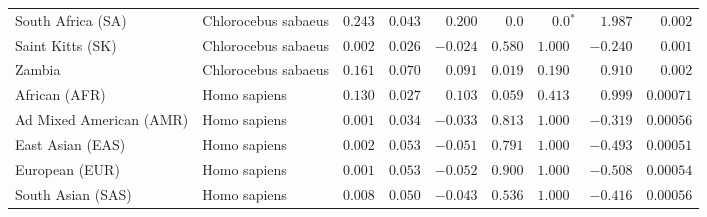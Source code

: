 \begin{center}
\begin{adjustbox}{width = 1\textwidth}
\begin{tabular}{|l|l|r|r|r|r|r|r|r|}
              South Africa (SA) &  Chlorocebus sabaeus &                                        $ 0.243$ &                                           $ 0.043$ &                      $ 0.200$ &            $0.0$ &                  $\bm{0.0{^*}}$ &                                           $ 1.987$ &           $ 0.002$ \\
               Saint Kitts (SK) &  Chlorocebus sabaeus &                                        $ 0.002$ &                                           $ 0.026$ &                      $-0.024$ &         $ 0.580$ &                      $ 1.000~~$ &                                           $-0.240$ &           $ 0.001$ \\
                         Zambia &  Chlorocebus sabaeus &                                        $ 0.161$ &                                           $ 0.070$ &                      $ 0.091$ &         $ 0.019$ &                      $ 0.190~~$ &                                           $ 0.910$ &           $ 0.002$ \\
                  African (AFR) &         Homo sapiens &                                        $ 0.130$ &                                           $ 0.027$ &                      $ 0.103$ &         $ 0.059$ &                      $ 0.413~~$ &                                           $ 0.999$ &          $0.00071$ \\
        Ad Mixed American (AMR) &         Homo sapiens &                                        $ 0.001$ &                                           $ 0.034$ &                      $-0.033$ &         $ 0.813$ &                      $ 1.000~~$ &                                           $-0.319$ &          $0.00056$ \\
               East Asian (EAS) &         Homo sapiens &                                        $ 0.002$ &                                           $ 0.053$ &                      $-0.051$ &         $ 0.791$ &                      $ 1.000~~$ &                                           $-0.493$ &          $0.00051$ \\
                 European (EUR) &         Homo sapiens &                                        $ 0.001$ &                                           $ 0.053$ &                      $-0.052$ &         $ 0.900$ &                      $ 1.000~~$ &                                           $-0.508$ &          $0.00054$ \\
              South Asian (SAS) &         Homo sapiens &                                        $ 0.008$ &                                           $ 0.050$ &                      $-0.043$ &         $ 0.536$ &                      $ 1.000~~$ &                                           $-0.416$ &          $0.00056$ \\

\end{tabular}
\end{adjustbox}
\end{center}
